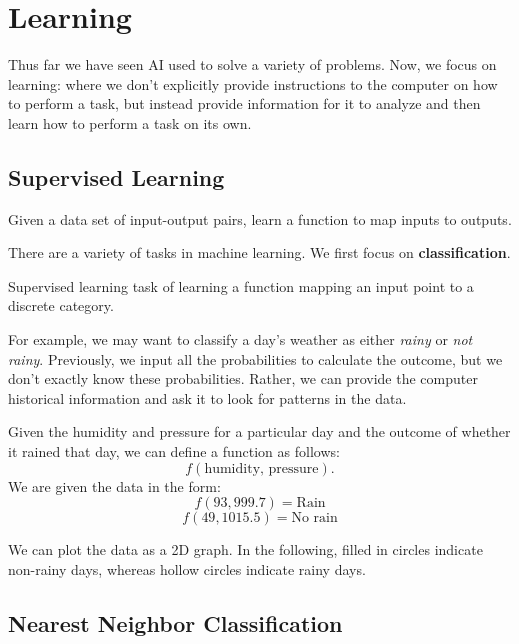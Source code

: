 \chapter{Learning}
Thus far we have seen AI used to solve a variety of problems. Now, we focus on learning: where we don't explicitly provide instructions to the computer on how to perform a task, but instead provide information for it to analyze and then learn how to perform a task on its own.
\section{Supervised Learning}
\begin{definition}
	Given a data set of input-output pairs, learn a function to map inputs to outputs.
\end{definition}

There are a variety of tasks in machine learning. We first focus on \textbf{classification}.

\begin{definition}[Classification]
	Supervised learning task of learning a function mapping an input point to a discrete category.
\end{definition}

For example, we may want to classify a day's weather as either \emph{rainy} or \emph{not rainy}. Previously, we input all the probabilities to calculate the outcome, but we don't exactly know these probabilities. Rather, we can provide the computer historical information and ask it to look for patterns in the data. \par

Given the humidity and pressure for a particular day and the outcome of whether it rained that day, we can define a function as follows:
\[
	f(\text{humidity, pressure}).
\]
We are given the data in the form:
\[
	f(93, 999.7) = \text{Rain}
\]
\[
	f(49, 1015.5) = \text{No rain} 
\]

We can plot the data as a 2D graph. In the following, filled in circles indicate non-rainy days, whereas hollow circles indicate rainy days.
\begin{figure}[H]
	\centering
	\label{fig:phgraph}
\end{figure}

\section{Nearest Neighbor Classification}

